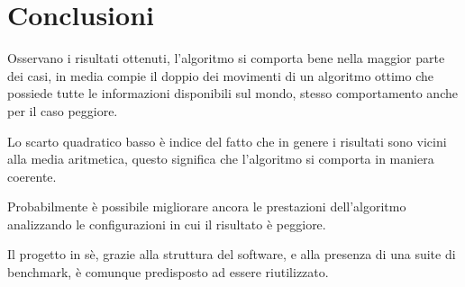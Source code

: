 \chapter*{Conclusioni}
Osservano i risultati ottenuti, l'algoritmo si comporta bene nella maggior parte dei casi, in media compie il doppio dei movimenti di un algoritmo ottimo che possiede tutte le informazioni disponibili sul mondo, stesso comportamento anche per il caso peggiore. 

Lo scarto quadratico basso è indice del fatto che in genere i risultati sono vicini alla media aritmetica, questo significa che l'algoritmo si comporta in maniera coerente. 

Probabilmente è possibile migliorare ancora le prestazioni dell'algoritmo analizzando le configurazioni in cui il risultato è peggiore. 

Il progetto in sè, grazie alla struttura del software, e alla presenza di una suite di benchmark, è comunque predisposto ad essere riutilizzato.